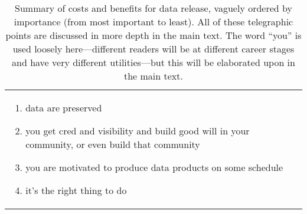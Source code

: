 \documentclass[12pt,twoside,pdftex]{article}
\begin{document}
\begin{table}
\begin{tabular}{@{}p{\cwidth}|p{\cwidth}@{}}
\begin{enumerate}
\item data are preserved
\item you get cred and visibility and build good will in your community, or even build that community
\item you are motivated to produce data products on some schedule
\item it's the right thing to do
\end{enumerate}\end{tabular}
\caption{Summary of costs and benefits for data release, vaguely
  ordered by importance (from most important to least). All of these
  telegraphic points are discussed in more depth in the main text. The
  word ``you'' is used loosely here---different readers will be at
  different career stages and have very different utilities---but this
  will be elaborated upon in the main text.\label{tab:data}}
\end{table}
\end{document}
